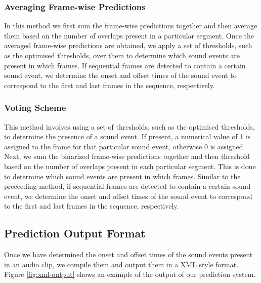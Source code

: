 \subsubsection{Averaging Frame-wise Predictions}
In this method we first sum the frame-wise predictions together and then average them based on the number of overlaps present in a particular segment. Once the averaged frame-wise predictions are obtained, we apply a set of thresholds, such as the optimised thresholds, over them to determine which sound events are present in which frames. If sequential frames are detected to contain a certain sound event, we determine the onset and offset times of the sound event to correspond to the first and last frames in the sequence, respectively.

\subsubsection{Voting Scheme}
This method involves using a set of thresholds, such as the optimised thresholds, to determine the presence of a sound event. If present, a numerical value of 1 is assigned to the frame for that particular sound event, otherwise 0 is assigned. Next, we sum the binarized frame-wise predictions together and then threshold based on the number of overlaps present in each particular segment. This is done to determine which sound events are present in which frames. Similar to the preceeding method, if sequential frames are detected to contain a certain sound event, we determine the onset and offset times of the sound event to correspond to the first and last frames in the sequence, respectively.


\subsection{Prediction Output Format}
Once we have determined the onset and offset times of the sound events present in an audio clip, we compile them and output them in a XML style format. Figure \ref{fig:xml-output} shows an example of the output of our prediction system.

